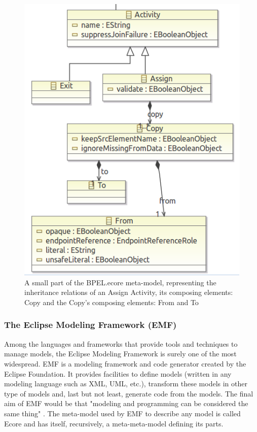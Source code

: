 \begin{figure}
  \begin{center}
    \includegraphics[scale=0.5]{pictures/BPELMetaModelExample.png}
    \caption{A small part of the BPEL.ecore meta-model, representing the inheritance relations of an Assign Activity, its composing elements: Copy and the Copy's composing elements: From and To}
    \label{BPELEcoreExample}
  \end{center}
\end{figure}

\subsubsection{The Eclipse Modeling Framework (EMF)}
\label{EMF}
Among the languages and frameworks that provide tools and techniques to manage models, the Eclipse Modeling Framework is surely one of the most widespread. 
EMF is a modeling framework and code generator created by the Eclipse Foundation. It provides facilities to define models (written in any modeling language such as XML, UML, etc.), transform these models in other type of models and, last but not least, generate code from the models. The final aim of EMF would be that "modeling and programming can be considered the same thing" \cite{Steinberg2009EMF}. 
The meta-model used by EMF to describe any model is called Ecore and has itself, recursively, a meta-meta-model defining its parts. 

